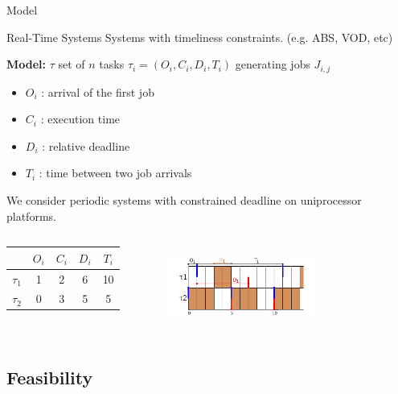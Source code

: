 \documentclass{beamer}
\begin{document}
	\begin{frame}{Model}
  \begin{block}{Real-Time Systems}
  Systems with timeliness constraints. (e.g. ABS, VOD, etc)
  \end{block}
  \textbf{Model:} $\tau$ set of $n$ tasks $\tau_i = (O_i, C_i, D_i, T_i)$ generating jobs $J_{i,j}$
      \begin{itemize}
      \item $O_i$ : arrival of the first job
      \item $C_i$ : execution time
      \item $D_i$ : relative deadline
      \item $T_i$ : time between two job arrivals
    \end{itemize}
  We consider periodic systems with constrained deadline on uniprocessor platforms.

  \begin{columns}[c] %
\begin{center}
\begin{tabular}{|r|c|c|c|c|}
 \hline
  & $O_i$ & $C_i$ & $D_i$ & $T_i$ \\
 \hline
 $\tau_1$ & 1 & 2 & 6 & 10\\
 \hline
 $\tau_2$ & 0 & 3 & 5 & 5\\
 \hline
\end{tabular}
\end{center}

\begin{figure}[h]
\includegraphics[width=0.7\textwidth]{figs/RTsystem_example.png}
\label{fig:llf}
\end{figure}
  \end{columns}


\end{frame}

    \subsection{Feasibility}
\end{document}
